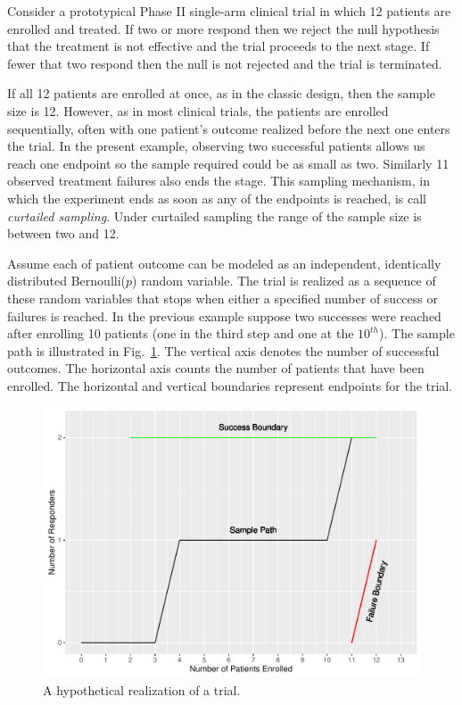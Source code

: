 \documentclass[review]{elsarticle}
\begin{document}
Consider a prototypical Phase II single-arm clinical trial in which 12 patients
are enrolled and treated. If two or more respond then we reject the null
hypothesis that the treatment is not effective and the trial proceeds to the 
next stage. If fewer that two respond then the null is not rejected and the 
trial is terminated.

If all 12 patients are enrolled at once, as in the classic
design, then the sample size is 12. However, as in most clinical trials, the
patients are enrolled sequentially, often with one patient's outcome realized
before the next one enters the trial. In the present example, observing two
successful patients allows us reach one endpoint so the sample required
could be as small as two. Similarly 11
observed treatment failures also ends the stage. This sampling mechanism, in
which the experiment ends as soon as any of the endpoints is reached, is
call {\em curtailed sampling}. Under curtailed sampling the range of the
sample size is between two and 12.

Assume each of patient outcome can be modeled as an independent,
identically distributed Bernoulli($p$) random variable. The trial is realized
as a sequence of these random variables that stops when either a
specified number of success or failures is reached. In the
previous example suppose two successes were reached after enrolling 10
patients (one in the third step and one at the $10^{th}$). The sample
path is illustrated
in Fig.~\ref{fig:kane_viz}. The vertical axis denotes the number of
successful outcomes. The horizontal axis counts the number of patients that
have been enrolled. The horizontal and vertical boundaries represent
endpoints for the trial.

\begin{figure}[t!]
\includegraphics[width=\textwidth]{KanePlot.pdf}
\caption{
A hypothetical realization of a trial.
}
\label{fig:kane_viz}
\end{figure}
\end{document}
